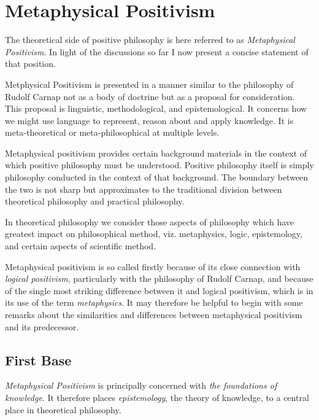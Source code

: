 
\chapter{Metaphysical Positivism}\label{MetaphysicalPositivism}

The theoretical side of positive philosophy is here referred to as \emph{Metaphysical Positivism}.
In light of the discussions so far I now present a concise statement of that position.

Metphysical Positivism is presented in a manner similar to the philosophy of Rudolf Carnap not as a body of doctrine but as a proposal for consideration.
This proposal is linguistic, methodological, and epistemological.
It concerns how we might use language to represent, reason about and apply knowledge.
It is meta-theoretical or meta-philosophical at multiple levels.

Metaphysical positivism provides certain background materials in the
context of which positive philosophy must be understood.
Positive philosophy itself is simply philosophy conducted in the
context of that background.
The boundary between the two is not sharp but approximates to the
traditional division between theoretical philosophy and practical
philosophy.

In theoretical philosophy we consider those aspects of philosophy
which have greatest impact on philosophical method, viz. metaphysics,
logic, epistemology, and certain aspects of scientific method.

Metaphysical positivism is so called firstly because of its close
connection with \emph{logical positivism}, particularly with the
philosophy of Rudolf Carnap, and because of the single most striking
difference between it and logical positivism, which is in its use of
the term \emph{metaphysics}.
It may therefore be helpful to begin with some remarks about the
similarities and differences between metaphysical positivism and its
predecessor.

\section{First Base}

{\it Metaphysical Positivism} is principally concerned with {\it the
  foundations of knowledge}. 
It therefore places {\it epistemology}, the theory of knowledge, to a
central place in theoretical philosophy. 

